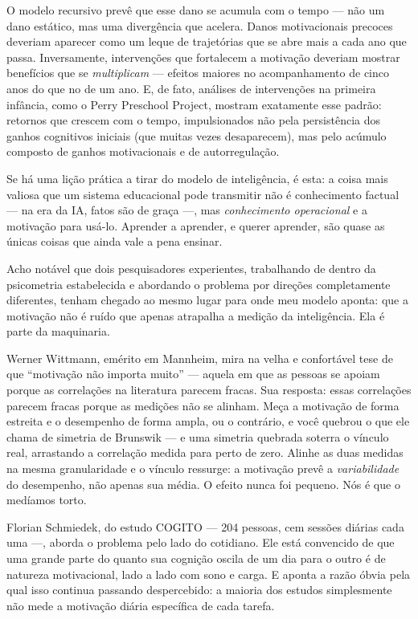 \documentclass[11pt, twoside, openright]{book}
\begin{document}
O modelo recursivo prevê que esse dano se acumula com o tempo --- não um dano estático, mas uma divergência que acelera. Danos motivacionais precoces deveriam aparecer como um leque de trajetórias que se abre mais a cada ano que passa. Inversamente, intervenções que fortalecem a motivação deveriam mostrar benefícios que se \textit{multiplicam} --- efeitos maiores no acompanhamento de cinco anos do que no de um ano. E, de fato, análises de intervenções na primeira infância, como o Perry Preschool Project, mostram exatamente esse padrão: retornos que crescem com o tempo, impulsionados não pela persistência dos ganhos cognitivos iniciais (que muitas vezes desaparecem), mas pelo acúmulo composto de ganhos motivacionais e de autorregulação.

Se há uma lição prática a tirar do modelo de inteligência, é esta: a coisa mais valiosa que um sistema educacional pode transmitir não é conhecimento factual --- na era da IA, fatos são de graça ---, mas \textit{conhecimento operacional} e a motivação para usá-lo. Aprender a aprender, e querer aprender, são quase as únicas coisas que ainda vale a pena ensinar.

Acho notável que dois pesquisadores experientes, trabalhando de dentro da psicometria estabelecida e abordando o problema por direções completamente diferentes, tenham chegado ao mesmo lugar para onde meu modelo aponta: que a motivação não é ruído que apenas atrapalha a medição da inteligência. Ela é parte da maquinaria.

Werner Wittmann, emérito em Mannheim, mira na velha e confortável tese de que ``motivação não importa muito'' --- aquela em que as pessoas se apoiam porque as correlações na literatura parecem fracas. Sua resposta: essas correlações parecem fracas porque as medições não se alinham. Meça a motivação de forma estreita e o desempenho de forma ampla, ou o contrário, e você quebrou o que ele chama de simetria de Brunswik --- e uma simetria quebrada soterra o vínculo real, arrastando a correlação medida para perto de zero. Alinhe as duas medidas na mesma granularidade e o vínculo ressurge: a motivação prevê a \textit{variabilidade} do desempenho, não apenas sua média. O efeito nunca foi pequeno. Nós é que o medíamos torto.

Florian Schmiedek, do estudo COGITO --- 204 pessoas, cem sessões diárias cada uma ---, aborda o problema pelo lado do cotidiano. Ele está convencido de que uma grande parte do quanto sua cognição oscila de um dia para o outro é de natureza motivacional, lado a lado com sono e carga. E aponta a razão óbvia pela qual isso continua passando despercebido: a maioria dos estudos simplesmente não mede a motivação diária específica de cada tarefa.
\end{document}
